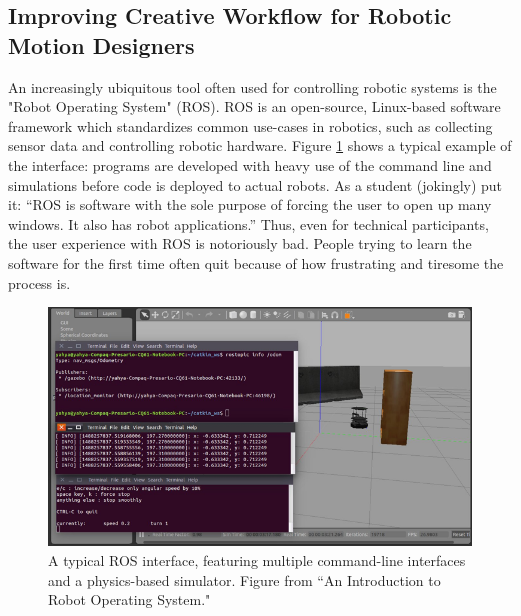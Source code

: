 \documentclass[arts,article,submit,moreauthors,pdftex,10pt,a4paper]{mdpi}
\begin{document}
\subsection{Improving Creative Workflow for Robotic Motion Designers}



An increasingly ubiquitous tool often used for controlling robotic systems is
the "Robot Operating System" (ROS). ROS is an open-source, Linux-based software framework which
standardizes common use-cases in robotics, such as collecting sensor data and controlling
robotic hardware. Figure \ref{alli1} shows a typical example of the interface:
programs are developed with heavy use of the command line and simulations before
code is deployed to actual robots. As a student (jokingly) put it: ``ROS is software with the sole purpose of
forcing the user to open up many windows. It also has robot applications.''
Thus, even for technical participants, the user experience with ROS is
notoriously bad. People trying to learn the software for the first time often
quit because of how frustrating and tiresome the process is.


\begin{figure}[h!]
\centering
\vspace{-.1in}
\includegraphics[width=.65\columnwidth]{alli1}
\caption{A typical ROS interface, featuring multiple command-line interfaces
and a physics-based simulator. Figure from ``An Introduction to Robot Operating
System."}
\label{alli1}
\end{figure}
\end{document}
